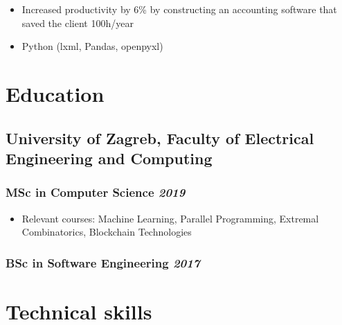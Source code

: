 \documentclass[a4paper]{article}
\newcommand{\bolditalicpair}
[2]
{\textbf{#1} \texorpdfstring{\hfill}{} \textit{#2}}
\begin{document}
\begin{itemize}
  \item Increased productivity by 6\% by constructing an accounting software that saved the client 100h/year
  \item Python (lxml, Pandas, openpyxl)
\end{itemize}





\section{Education}
\subsection{\bolditalicpair{University of Zagreb, Faculty of Electrical Engineering and Computing}{}}

\subsubsection{\bolditalicpair{MSc in Computer Science}{2019}}

\begin{itemize}
  \item Relevant courses: Machine Learning, Parallel Programming, Extremal Combinatorics, Blockchain Technologies %
\end{itemize}

\subsubsection{\bolditalicpair{BSc in Software Engineering}{2017}}



\section{Technical skills}
\end{document}
